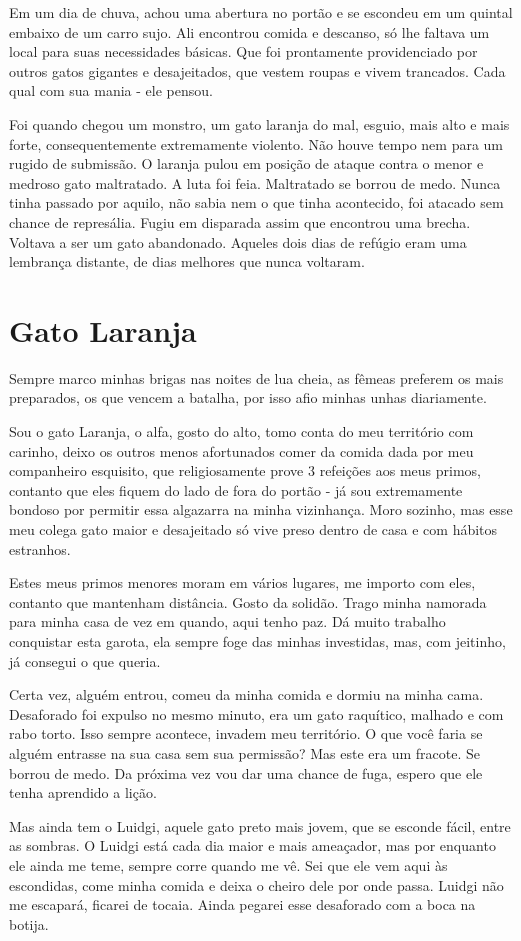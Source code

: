 \documentclass[a4paper,14pt]{book}
\begin{document}
Em um dia de chuva, achou uma abertura no portão e se escondeu em um quintal embaixo de um carro sujo. Ali encontrou comida e descanso, só lhe faltava um local para suas necessidades básicas. Que foi prontamente providenciado por outros gatos gigantes e desajeitados, que vestem  roupas e vivem trancados. Cada qual com sua mania - ele pensou.

Foi quando chegou um monstro, um gato laranja do mal, esguio, mais alto e mais forte, consequentemente extremamente violento. Não houve tempo nem para um rugido de submissão. O laranja pulou em posição de ataque contra o menor e medroso gato maltratado. A luta foi feia. Maltratado se borrou de medo. Nunca tinha passado por aquilo, não sabia nem o que tinha acontecido, foi atacado sem chance de represália. Fugiu em disparada assim que encontrou uma brecha. Voltava a ser um gato abandonado. Aqueles dois dias de refúgio eram uma lembrança distante, de dias melhores que nunca voltaram.

\section*{Gato Laranja}

Sempre marco minhas brigas nas noites de lua cheia, as fêmeas preferem os mais preparados, os que vencem a batalha, por isso afio minhas unhas diariamente.

Sou o gato Laranja, o alfa, gosto do alto, tomo conta do meu território com carinho, deixo os outros menos afortunados comer da comida dada por meu companheiro esquisito, que religiosamente prove 3 refeições aos meus primos, contanto que eles fiquem do lado de fora do portão - já sou extremamente bondoso por permitir essa algazarra na minha vizinhança. 
Moro sozinho, mas esse meu colega gato maior e desajeitado só vive preso dentro de casa e com hábitos estranhos. 

Estes meus primos menores moram em vários lugares, me importo com eles, contanto que mantenham distância. Gosto da solidão. Trago minha namorada para minha casa de vez em quando, aqui tenho paz. Dá muito trabalho conquistar esta garota, ela sempre foge das minhas investidas, mas, com jeitinho, já consegui o que queria.

Certa vez, alguém entrou, comeu da minha comida e dormiu na minha cama. Desaforado foi expulso no mesmo minuto, era um gato raquítico, malhado e com rabo torto. Isso sempre acontece, invadem meu território. O que você faria se alguém entrasse na sua casa sem sua permissão? Mas este era um fracote. Se borrou de medo. Da próxima vez vou dar uma chance de fuga, espero que ele tenha aprendido a lição.

Mas ainda tem o Luidgi, aquele gato preto mais jovem, que se esconde fácil, entre as sombras. O Luidgi está cada dia maior e mais ameaçador, mas por enquanto ele ainda me teme, sempre corre quando me vê. Sei que ele vem aqui às escondidas, come minha comida e deixa o cheiro dele por onde passa. Luidgi não me escapará, ficarei de tocaia. Ainda pegarei esse desaforado com a boca na botija.
\end{document}
